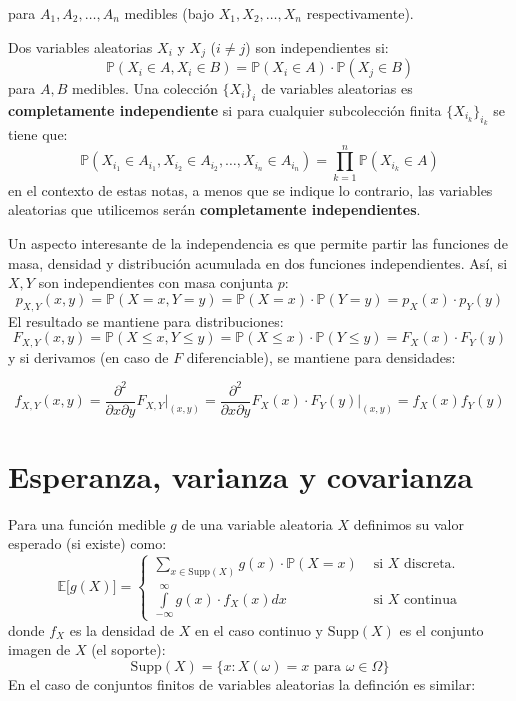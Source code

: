 \documentclass[
]{book}
\begin{document}
para \(A_1, A_2, \dots, A_n\) medibles (bajo \(X_1, X_2, \dots, X_n\) respectivamente).

Dos variables aleatorias \(X_i\) y \(X_j\) (\(i \neq j\)) son independientes si:
\[
\mathbb{P}(X_i \in A, X_i \in B) = \mathbb{P}(X_i \in A) \cdot \mathbb{P}(X_j \in B)
\]
para \(A,B\) medibles. Una colección \(\{ X_i \}_{i}\) de variables aleatorias es \textbf{completamente independiente} si para cualquier subcolección finita \(\{ X_{i_k} \}_{i_k}\) se tiene que:
\[
\mathbb{P}(X_{i_1} \in A_{i_1}, X_{i_2} \in A_{i_2}, \dots, X_{i_n} \in A_{i_n} ) = \prod_{k = 1}^n \mathbb{P}(X_{i_k} \in A) 
\]
en el contexto de estas notas, a menos que se indique lo contrario, las variables aleatorias que utilicemos serán \textbf{completamente independientes}.

Un aspecto interesante de la independencia es que permite partir las funciones de masa, densidad y distribución acumulada en dos funciones independientes. Así, si \(X,Y\) son independientes con masa conjunta \(p\):
\[
p_{X,Y}(x,y) = \mathbb{P}(X = x, Y = y) = \mathbb{P}(X = x)\cdot\mathbb{P}(Y = y) = p_X(x)\cdot p_Y(y)
\]
El resultado se mantiene para distribuciones:
\[
F_{X,Y}(x,y) = \mathbb{P}(X \leq x, Y \leq y) = \mathbb{P}(X \leq x)\cdot\mathbb{P}(Y \leq y) = F_X(x)\cdot F_Y(y)
\]
y si derivamos (en caso de \(F\) diferenciable), se mantiene para densidades:

\[
f_{X,Y}(x,y) = \dfrac{\partial^2}{\partial x\partial y} F_{X,Y}\Big|_{(x,y)} = \dfrac{\partial^2}{\partial x\partial y} F_X(x)\cdot F_Y(y)\Big|_{(x,y)} = f_X(x) f_Y(y)
\]

\hypertarget{esperanza-varianza-y-covarianza}{%
\section{Esperanza, varianza y covarianza}\label{esperanza-varianza-y-covarianza}}

Para una función medible \(g\) de una variable aleatoria \(X\) definimos su valor esperado (si existe) como:
\[
\mathbb{E}\big[g(X)\big] = \begin{cases}
\sum\limits_{x \in \text{Supp}(X)} g(x) \cdot \mathbb{P}(X  = x) & \text{ si } X \text{ discreta.} \\
\int\limits_{-\infty}^{\infty} g(x) \cdot f_X(x) dx& \text{ si } X \text{ continua}
\end{cases}
\]
donde \(f_X\) es la densidad de \(X\) en el caso continuo y \(\text{Supp}(X)\) es el conjunto imagen de \(X\) (el soporte):
\[
\text{Supp}(X) = \{ x : X(\omega) = x \text{ para } \omega \in \Omega \}
\]
En el caso de conjuntos finitos de variables aleatorias la definción es similar:
\end{document}
